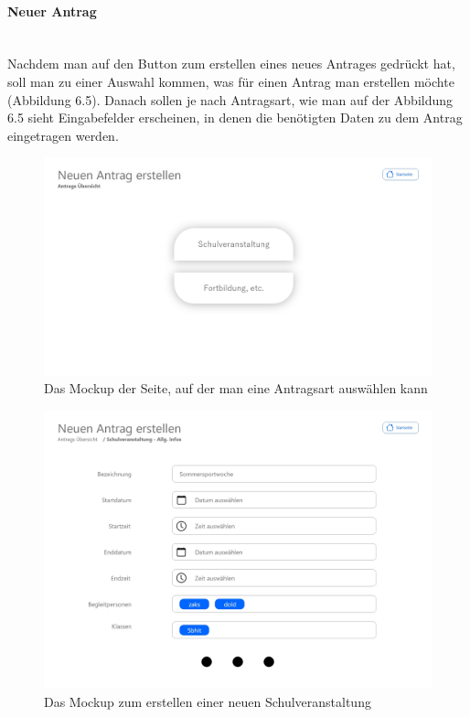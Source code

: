 \paragraph{Neuer Antrag}
~\\
Nachdem man auf den Button zum erstellen eines neues Antrages gedrückt hat, soll man zu einer Auswahl kommen, was für einen Antrag man erstellen möchte (Abbildung 6.5). Danach sollen je nach Antragsart, wie man auf der Abbildung 6.5 sieht Eingabefelder erscheinen, in denen die benötigten Daten zu dem Antrag eingetragen werden.
\begin{figure}[H]
	\centering
	\includegraphics[width=1\linewidth]{images/Mockup-Neuer-Antrag}
	\caption[Mockup neuer Antrag]{Das Mockup der Seite, auf der man eine Antragsart auswählen kann}
	\label{fig:mockupNeu}
\end{figure}
\begin{figure}[H]
	\centering
	\includegraphics[width=1\linewidth]{images/Mockup-Antrag-erstellen}
	\caption[Mockup Antrag erstellen]{Das Mockup zum erstellen einer neuen Schulveranstaltung}
	\label{fig:mockupErstellen}
\end{figure}

